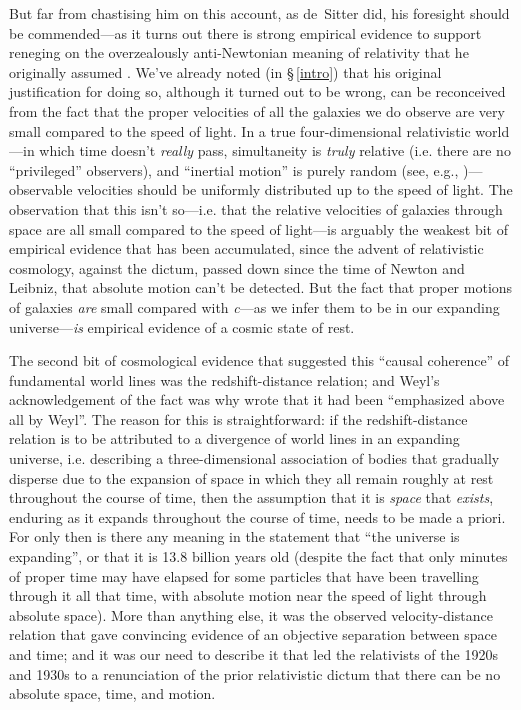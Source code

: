 \documentclass[12 pt]{article}
\begin{document}
But far from chastising him on this account, as de~Sitter did, his foresight should be commended---as it turns out there is strong empirical evidence to support reneging on the overzealously anti-Newtonian meaning of relativity that he originally assumed \citep{Einstein1905}. We've already noted (in \S\,\ref{intro}) that his original justification for doing so, although it turned out to be wrong, can be reconceived from the fact that the proper velocities of all the galaxies we do observe are very small compared to the speed of light. In a true four-dimensional relativistic world---in which time doesn't \textit{really} pass, simultaneity is \textit{truly} relative (i.e. there are no ``privileged'' observers), and ``inertial motion'' is purely random (see, e.g., \citet{Putnam1967})---observable velocities should be uniformly distributed up to the speed of light. The observation that this isn't so---i.e. that the relative velocities of galaxies through space are all small compared to the speed of light---is arguably the weakest bit of empirical evidence that has been accumulated, since the advent of relativistic cosmology, against the dictum, passed down since the time of Newton and Leibniz, that absolute motion can't be detected. But the fact that proper motions of galaxies \textit{are} small compared with \textit{c}---as we infer them to be in our expanding universe---\textit{is} empirical evidence of a cosmic state of rest.

The second bit of cosmological evidence that suggested this ``causal coherence'' of fundamental world lines was the redshift-distance relation; and Weyl's acknowledgement of the fact \citep{Weyl1923a,Weyl1930} was why \citet{Robertson1933} wrote that it had been ``emphasized above all by Weyl''. The reason for this is straightforward: if the redshift-distance relation is to be attributed to a divergence of world lines in an expanding universe, i.e. describing a three-dimensional association of bodies that gradually disperse due to the expansion of space in which they all remain roughly at rest throughout the course of time, then the assumption that it is \textit{space} that \textit{exists}, enduring as it expands throughout the course of time, needs to be made a priori. For only then is there any meaning in the statement that ``the universe is expanding'', or that it is 13.8 billion years old (despite the fact that only minutes of proper time may have elapsed for some particles that have been travelling through it all that time, with absolute motion near the speed of light through absolute space). More than anything else, it was the observed velocity-distance relation that gave convincing evidence of an objective separation between space and time; and it was our need to describe it that led the relativists of the 1920s and 1930s to a renunciation of the prior relativistic dictum that there can be no absolute space, time, and motion.
\end{document}
